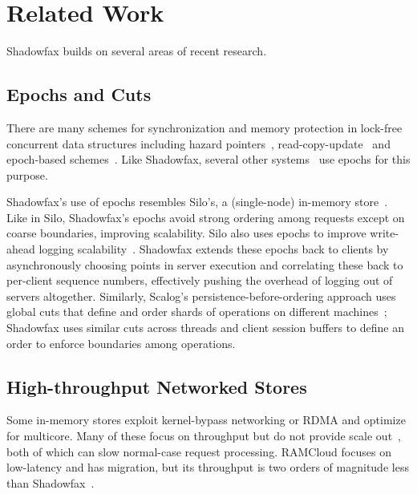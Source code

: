 \section{Related Work}
\label{sec:related}

Shadowfax builds on several areas of recent
research.

\subsection{Epochs and Cuts}
There are many schemes for synchronization and memory protection in lock-free
concurrent data structures including hazard pointers~\cite{hazard},
read-copy-update~\cite{rcu} and epoch-based schemes~\cite{epochs,epochs-phd}.
Like Shadowfax, several other
systems~\cite{bwtree,deuteronomy,deuteronomy-ranges,hekaton-indexing} use epochs for this purpose.


Shadowfax's use of epochs resembles Silo's, a (single-node)
in-memory store~\cite{silo}. Like in Silo, Shadowfax's epochs avoid strong
ordering among requests except on coarse boundaries, improving scalability.
Silo also uses epochs to improve write-ahead logging
scalability~\cite{silor}.  Shadowfax extends these epochs back to clients by
asynchronously choosing points in server execution and correlating these back
to per-client sequence numbers, effectively pushing the overhead of logging out
of servers altogether. Similarly, Scalog's persistence-before-ordering approach uses
global cuts that define and order shards of operations on different
machines~\cite{scalog}; Shadowfax uses similar cuts across threads and client
session buffers to define an order to enforce boundaries among operations.

\subsection{High-throughput Networked Stores}
Some in-memory stores exploit kernel-bypass networking or RDMA and optimize
for multicore. Many of these focus on throughput but do not provide
scale out~\cite{pilaf,mica,herd}, both of which
can slow normal-case request processing. RAMCloud focuses on low-latency
and has migration, but its throughput is two
orders of magnitude less than Shadowfax~\cite{ramcloud,ramcloud-recovery}.

